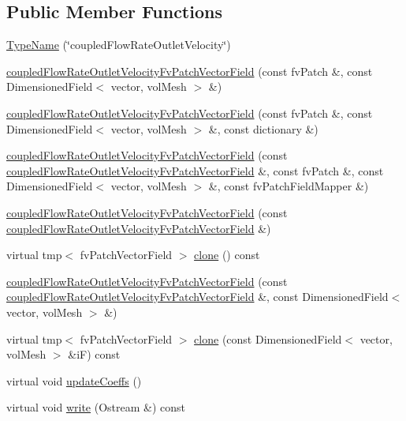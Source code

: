 \subsection*{Public Member Functions}
\begin{DoxyCompactItemize}
\item 
\hyperlink{classFoam_1_1coupledFlowRateOutletVelocityFvPatchVectorField_afb62573ff58a2b01874079aa9a83c772}{Type\+Name} (\char`\"{}coupled\+Flow\+Rate\+Outlet\+Velocity\char`\"{})
\item 
\hyperlink{classFoam_1_1coupledFlowRateOutletVelocityFvPatchVectorField_a12a8467b944c58a5ea7386982681bb3d}{coupled\+Flow\+Rate\+Outlet\+Velocity\+Fv\+Patch\+Vector\+Field} (const fv\+Patch \&, const Dimensioned\+Field$<$ vector, vol\+Mesh $>$ \&)
\item 
\hyperlink{classFoam_1_1coupledFlowRateOutletVelocityFvPatchVectorField_a97a5052b20afdfcc56f34b8dee556b04}{coupled\+Flow\+Rate\+Outlet\+Velocity\+Fv\+Patch\+Vector\+Field} (const fv\+Patch \&, const Dimensioned\+Field$<$ vector, vol\+Mesh $>$ \&, const dictionary \&)
\item 
\hyperlink{classFoam_1_1coupledFlowRateOutletVelocityFvPatchVectorField_ab888292435f6cbb7f3a1041721d1e287}{coupled\+Flow\+Rate\+Outlet\+Velocity\+Fv\+Patch\+Vector\+Field} (const \hyperlink{classFoam_1_1coupledFlowRateOutletVelocityFvPatchVectorField}{coupled\+Flow\+Rate\+Outlet\+Velocity\+Fv\+Patch\+Vector\+Field} \&, const fv\+Patch \&, const Dimensioned\+Field$<$ vector, vol\+Mesh $>$ \&, const fv\+Patch\+Field\+Mapper \&)
\item 
\hyperlink{classFoam_1_1coupledFlowRateOutletVelocityFvPatchVectorField_a99ee4ab1ff147fbf693db20fae3194e1}{coupled\+Flow\+Rate\+Outlet\+Velocity\+Fv\+Patch\+Vector\+Field} (const \hyperlink{classFoam_1_1coupledFlowRateOutletVelocityFvPatchVectorField}{coupled\+Flow\+Rate\+Outlet\+Velocity\+Fv\+Patch\+Vector\+Field} \&)
\item 
virtual tmp$<$ fv\+Patch\+Vector\+Field $>$ \hyperlink{classFoam_1_1coupledFlowRateOutletVelocityFvPatchVectorField_af0f4bc68c73acc08f11adb3a8957d875}{clone} () const
\item 
\hyperlink{classFoam_1_1coupledFlowRateOutletVelocityFvPatchVectorField_a65027b15ce88242a82a7370972aa4c1c}{coupled\+Flow\+Rate\+Outlet\+Velocity\+Fv\+Patch\+Vector\+Field} (const \hyperlink{classFoam_1_1coupledFlowRateOutletVelocityFvPatchVectorField}{coupled\+Flow\+Rate\+Outlet\+Velocity\+Fv\+Patch\+Vector\+Field} \&, const Dimensioned\+Field$<$ vector, vol\+Mesh $>$ \&)
\item 
virtual tmp$<$ fv\+Patch\+Vector\+Field $>$ \hyperlink{classFoam_1_1coupledFlowRateOutletVelocityFvPatchVectorField_a089f8c8dc7161cb741c2b911efc67d76}{clone} (const Dimensioned\+Field$<$ vector, vol\+Mesh $>$ \&iF) const
\item 
virtual void \hyperlink{classFoam_1_1coupledFlowRateOutletVelocityFvPatchVectorField_a7e24eafac629d3733181cd942d4c902f}{update\+Coeffs} ()
\item 
virtual void \hyperlink{classFoam_1_1coupledFlowRateOutletVelocityFvPatchVectorField_a293fdfec8bdfbd5c3913ab4c9f3454ff}{write} (Ostream \&) const
\end{DoxyCompactItemize}


